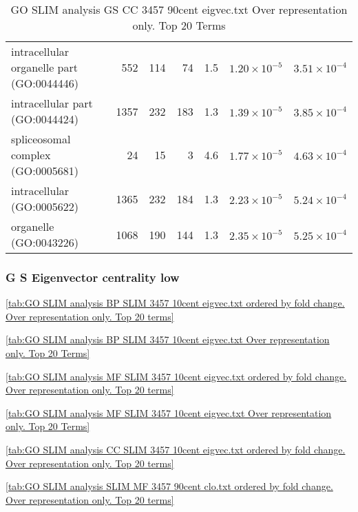 \begin{table}[ht]
\begin{adjustbox}{width=\textwidth}
\begin{tabular}{lrrrrrr}
  intracellular organelle part (GO:0044446) & 552 & 114 & 74 & 1.5 & $1.20 \times 10^{-5}$ & $3.51 \times 10^{-4}$ \\ 
  intracellular part (GO:0044424) & 1357 & 232 & 183 & 1.3 & $1.39 \times 10^{-5}$ & $3.85 \times 10^{-4}$ \\ 
  spliceosomal complex (GO:0005681) & 24 & 15 & 3 & 4.6 & $1.77 \times 10^{-5}$ & $4.63 \times 10^{-4}$ \\ 
  intracellular (GO:0005622) & 1365 & 232 & 184 & 1.3 & $2.23 \times 10^{-5}$ & $5.24 \times 10^{-4}$ \\ 
  organelle (GO:0043226) & 1068 & 190 & 144 & 1.3 & $2.35 \times 10^{-5}$ & $5.25 \times 10^{-4}$ \\ 
   \hline
\end{tabular}
\end{adjustbox}
\caption{GO SLIM analysis GS CC 3457 90cent eigvec.txt Over representation only. Top 20 Terms} 
\label{tab:GO SLIM analysis GS CC 3457 90cent eigvec.txt Over representation only. Top 20 Terms}
\end{table}

\clearpage


\subsubsection{G S Eigenvector centrality low}

\ref{tab:GO SLIM analysis BP SLIM 3457 10cent eigvec.txt ordered by fold change. Over representation only. Top 20 terms}

\ref{tab:GO SLIM analysis BP SLIM 3457 10cent eigvec.txt Over representation only. Top 20 Terms}

\ref{tab:GO SLIM analysis MF SLIM 3457 10cent eigvec.txt ordered by fold change. Over representation only. Top 20 terms}

\ref{tab:GO SLIM analysis MF SLIM 3457 10cent eigvec.txt Over representation only. Top 20 Terms}

\ref{tab:GO SLIM analysis CC SLIM 3457 10cent eigvec.txt ordered by fold change. Over representation only. Top 20 terms}

\ref{tab:GO SLIM analysis SLIM MF 3457 90cent clo.txt ordered by fold change. Over representation only. Top 20 terms}


